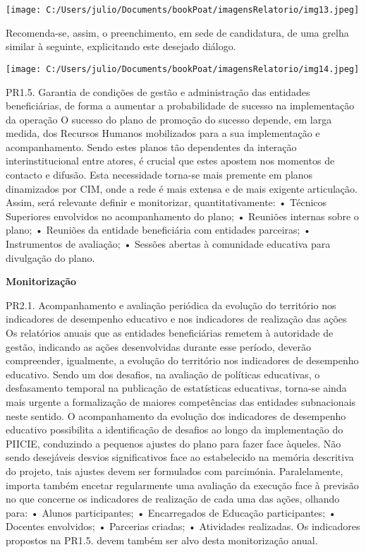 \documentclass[
]{book}
\begin{document}
\texttt{[image: C:/Users/julio/Documents/bookPoat/imagensRelatorio/img13.jpeg]}

Recomenda-se, assim, o preenchimento, em sede de candidatura, de uma grelha similar à seguinte, explicitando este desejado diálogo.

\texttt{[image: C:/Users/julio/Documents/bookPoat/imagensRelatorio/img14.jpeg]}

PR1.5. Garantia de condições de gestão e administração das entidades beneficiárias, de forma a aumentar a probabilidade de sucesso na implementação da operação
O sucesso do plano de promoção do sucesso depende, em larga medida, dos Recursos Humanos mobilizados para a sua implementação e acompanhamento. Sendo estes planos tão dependentes da interação interinstitucional entre atores, é crucial que estes apostem nos momentos de contacto e difusão. Esta necessidade torna-se mais premente em planos dinamizados por CIM, onde a rede é mais extensa e de mais exigente articulação.\\
Assim, será relevante definir e monitorizar, quantitativamente:
• Técnicos Superiores envolvidos no acompanhamento do plano;
• Reuniões internas sobre o plano;
• Reuniões da entidade beneficiária com entidades parceiras;
• Instrumentos de avaliação;
• Sessões abertas à comunidade educativa para divulgação do plano.

\textbf{Monitorização}

PR2.1. Acompanhamento e avaliação periódica da evolução do território nos indicadores de desempenho educativo e nos indicadores de realização das ações
Os relatórios anuais que as entidades beneficiárias remetem à autoridade de gestão, indicando as ações desenvolvidas durante esse período, deverão compreender, igualmente, a evolução do território nos indicadores de desempenho educativo. Sendo um dos desafios, na avaliação de políticas educativas, o desfasamento temporal na publicação de estatísticas educativas, torna-se ainda mais urgente a formalização de maiores competências das entidades subnacionais neste sentido.
O acompanhamento da evolução dos indicadores de desempenho educativo possibilita a identificação de desafios ao longo da implementação do PIICIE, conduzindo a pequenos ajustes do plano para fazer face àqueles. Não sendo desejáveis desvios significativos face ao estabelecido na memória descritiva do projeto, tais ajustes devem ser formulados com parcimónia.
Paralelamente, importa também encetar regularmente uma avaliação da execução face à previsão no que concerne os indicadores de realização de cada uma das ações, olhando para:
• Alunos participantes;
• Encarregados de Educação participantes;
• Docentes envolvidos;
• Parcerias criadas;
• Atividades realizadas.
Os indicadores propostos na PR1.5. devem também ser alvo desta monitorização anual.
\end{document}
